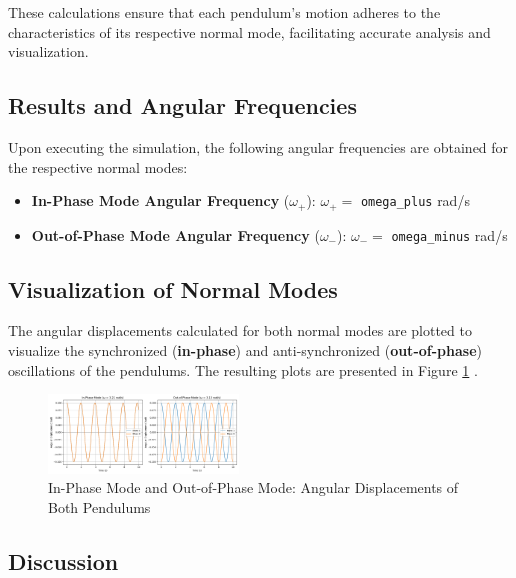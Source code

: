 \documentclass[12pt]{report} %
\begin{document}
These calculations ensure that each pendulum's motion adheres to the characteristics of its respective normal mode, facilitating accurate analysis and visualization.

\subsection{Results and Angular Frequencies}
\label{subsec:part1_task4_results}

Upon executing the simulation, the following angular frequencies are obtained for the respective normal modes:

\begin{itemize}
    \item \textbf{In-Phase Mode Angular Frequency} (\( \omega_+ \)): \( \omega_+ = \) \texttt{omega\_plus} rad/s
    \item \textbf{Out-of-Phase Mode Angular Frequency} (\( \omega_- \)): \( \omega_- = \) \texttt{omega\_minus} rad/s
\end{itemize}

\subsection{Visualization of Normal Modes}
\label{subsec:part1_task4_visualization}

The angular displacements calculated for both normal modes are plotted to visualize the synchronized (\textbf{in-phase}) and anti-synchronized (\textbf{out-of-phase}) oscillations of the pendulums. The resulting plots are presented in Figure \ref{fig:in_phase_plot} .

\begin{figure}[h]
    \centering
    \includegraphics[width=0.45\textwidth]{in_phase_plot.png}
    \caption{In-Phase Mode and Out-of-Phase Mode: Angular Displacements of Both Pendulums}
    \label{fig:in_phase_plot}
\end{figure}


\subsection{Discussion}
\label{subsec:part1_task4_discussion}
\end{document}
